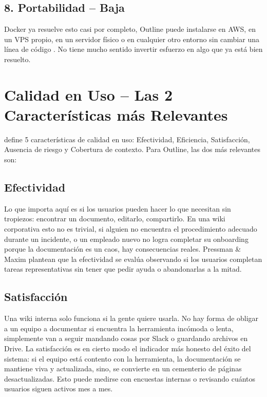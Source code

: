\documentclass{report}
\begin{document}
\subsection*{8. Portabilidad -- Baja }

Docker ya resuelve esto casi por completo, Outline puede instalarse en AWS, en un VPS propio, en un servidor físico o en cualquier otro entorno sin cambiar una línea de código \cite{outline2025}. 
No tiene mucho sentido invertir esfuerzo en algo que ya está bien resuelto.

\newpage

\section*{Calidad en Uso -- Las 2 Características más Relevantes}

\cite{iso25010_2023} define 5 características de calidad en uso: Efectividad, Eficiencia, Satisfacción, Ausencia de riesgo y Cobertura de contexto. Para Outline, las dos más relevantes son:

\subsection*{Efectividad}

Lo que importa aquí es si los usuarios pueden hacer lo que necesitan sin tropiezos: encontrar un documento, editarlo, compartirlo. En una wiki corporativa esto no es trivial, si alguien no encuentra el procedimiento adecuado durante un incidente, o un empleado nuevo no logra completar su onboarding porque la documentación es un caos, hay consecuencias reales. Pressman \& Maxim \cite{pressman2020} plantean que la efectividad se evalúa observando si los usuarios completan tareas representativas sin tener que pedir ayuda o abandonarlas a la mitad. 

\subsection*{Satisfacción}

Una wiki interna solo funciona si la gente quiere usarla. No hay forma de obligar a un equipo a documentar si encuentra la herramienta incómoda o lenta, simplemente van a seguir mandando cosas por Slack o guardando archivos en Drive. La satisfacción es en cierto modo el indicador más honesto del éxito del sistema: si el equipo está contento con la herramienta, la documentación se mantiene viva y actualizada, sino, se convierte en un cementerio de páginas desactualizadas. Esto puede medirse con encuestas internas o revisando cuántos usuarios siguen activos mes a mes.
\end{document}
